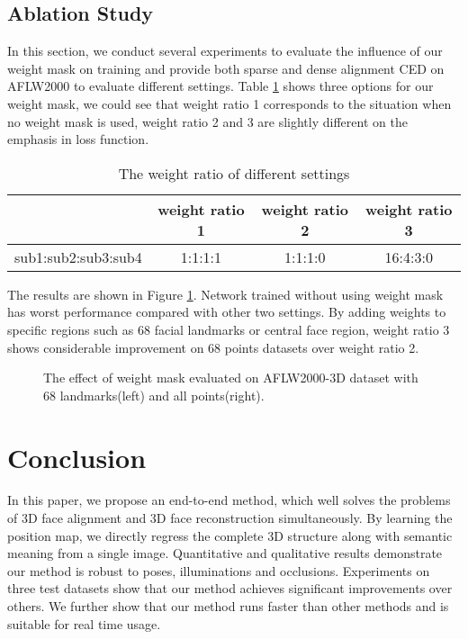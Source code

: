 \documentclass[runningheads]{llncs}
\begin{document}
\subsection{Ablation Study} 
\label{sec: ablation}
In this section, we conduct several experiments to evaluate the influence of our weight mask on training and provide both sparse and dense alignment CED on AFLW2000 to evaluate different settings. Table \ref{tab: ratio} shows three options for our weight mask, we could see that weight ratio 1 corresponds to the situation when no weight mask is used, weight ratio 2 and 3 are slightly different on the emphasis in loss function.  
\begin{table}
\vspace{-3mm}
\begin{center}
\caption{The weight ratio of different settings}
\label{tab: ratio}
\begin{tabular}{|c|c|c|c|}
\hline
  &  weight ratio 1 & weight ratio 2 & weight ratio 3 \\
\hline
sub1:sub2:sub3:sub4 & 1:1:1:1 & 1:1:1:0 & 16:4:3:0\\
\hline
\end{tabular}
\end{center}
\vspace{-3mm}
\end{table}
The results are shown in Figure \ref{fig: ablation}. Network trained without using weight mask has worst performance compared with other two settings. By adding weights to specific regions such as 68 facial landmarks or central face region, weight ratio 3 shows considerable improvement on 68 points datasets over weight ratio 2.
\begin{figure}
  \vspace{-3mm}
  \centering
\caption{The effect of weight mask evaluated on AFLW2000-3D dataset with 68 landmarks(left) and all points(right).}
  \label{fig: ablation} \vspace{-3mm}
\end{figure} 


\section{Conclusion}
In this paper, we propose an end-to-end method, which well solves the problems of 3D face alignment and 3D face reconstruction simultaneously. By learning the position map, we directly regress the complete 3D structure along with semantic meaning from a single image. Quantitative and qualitative results demonstrate our method is robust to poses, illuminations and occlusions. 
Experiments on three test datasets show that our method achieves significant improvements over others. 
We further show that our method runs faster than other methods and is suitable for real time usage.
\end{document}
